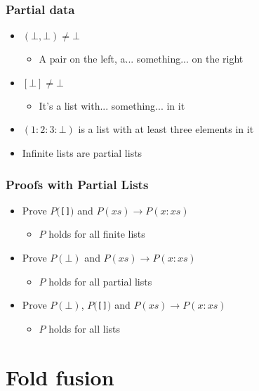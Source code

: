\documentclass{beamer}
\begin{document}
\begin{frame}[fragile]
    \frametitle{Partial data}
    \begin{itemize}
        \item $(\bot, \bot) \ne \bot$
        \begin{itemize}
            \item A pair on the left, a... something... on the right
        \end{itemize}
        \item $[\bot] \ne \bot$
        \begin{itemize}
            \item It's a list with... something... in it
        \end{itemize}
        \item $(1 : 2 : 3 : \bot)$ is a list with at least three elements in it
        \item Infinite lists are partial lists
    \end{itemize}
\end{frame}

\begin{frame}[fragile]
    \frametitle{Proofs with Partial Lists}
    \begin{itemize}
        \item Prove $P($\verb?[]?$)$ and $P(xs) \rightarrow P(x:xs)$ 
            \begin{itemize}
                \item $P$ holds for all finite lists
            \end{itemize}
        \item Prove $P(\bot)$ and $P(xs) \rightarrow P(x:xs)$ 
            \begin{itemize}
                \item $P$ holds for all partial lists
            \end{itemize}
        \item Prove $P(\bot)$, $P($\verb?[]?$)$ and $P(xs) \rightarrow P(x:xs)$ 
            \begin{itemize}
                \item $P$ holds for all lists
            \end{itemize}
    \end{itemize}
\end{frame}

\section{Fold fusion}
\end{document}
